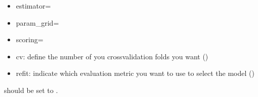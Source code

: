 \documentclass[letterpaper,10pt,english]{sphinxmanual}
\begin{document}
\begin{itemize}
\item {} 
\sphinxAtStartPar
estimator=

\item {} 
\sphinxAtStartPar
param\_grid=

\item {} 
\sphinxAtStartPar
scoring=

\item {} 
\sphinxAtStartPar
cv: define the number of you cross\sphinxhyphen{}validation folds you want ()

\item {} 
\sphinxAtStartPar
refit: indicate which evaluation metric you want to use to select the model ()

\end{itemize}

\sphinxAtStartPar
{}  should be set to .
\end{document}
